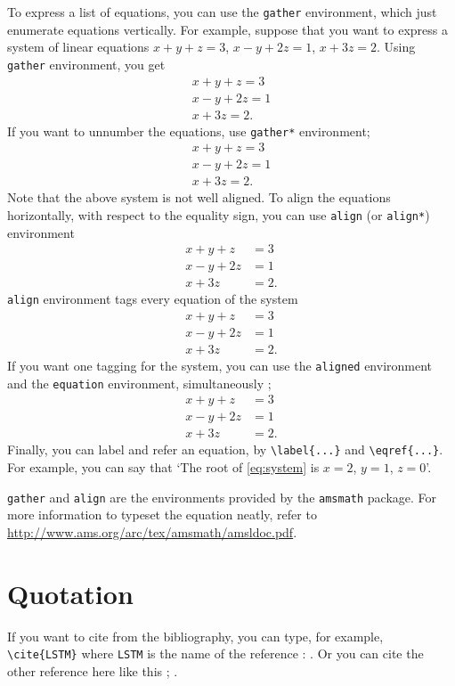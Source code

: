 \documentclass{report}
\begin{document}
To express a list of equations, you can use the \texttt{gather} environment, which just enumerate equations vertically.
For example, suppose that you want to express a system of linear equations \(x+y+z=3\), \(x-y+2z=1\), \(x+3z=2\).
Using \texttt{gather} environment, you get
\begin{gather}
x+y+z=3\\
x-y+2z=1\\
x+3z=2.
\end{gather}
If you want to unnumber the equations, use \texttt{gather*} environment;
\begin{gather*}
x+y+z=3\\
x-y+2z=1\\
x+3z=2.
\end{gather*}
Note that the above system is not well aligned.
To align the equations horizontally, with respect to the equality sign, you can use \texttt{align} (or \texttt{align*}) environment
\begin{align*}
x+y+z&=3\\
x-y+2z&=1\\
x+3z&=2.
\end{align*}
\texttt{align} environment tags every equation of the system
\begin{align}
x+y+z&=3\\
x-y+2z&=1\\
x+3z&=2.
\end{align}
If you want one tagging for the system, you can use the \texttt{aligned} environment and the \texttt{equation} environment, simultaneously ;
\begin{equation}\label{eq:system}
\begin{aligned}
x+y+z&=3\\
x-y+2z&=1\\
x+3z&=2.
\end{aligned}
\end{equation}
Finally, you can label and refer an equation, by \verb|\label{...}| and \verb|\eqref{...}|.
For example, you can say that `The root of \eqref{eq:system} is \(x=2\), \(y=1\), \(z=0\)'.

\texttt{gather} and \texttt{align} are the environments provided by the \texttt{amsmath} package.
For more information to typeset the equation neatly, refer to \url{http://www.ams.org/arc/tex/amsmath/amsldoc.pdf}.

\section{Quotation}
If you want to cite from the bibliography, you can type, for example, \verb|\cite{LSTM}| where \texttt{LSTM} is the name of the reference : \cite{LSTM}.
Or you can cite the other reference here like this ; \cite{pure}.
\end{document}
